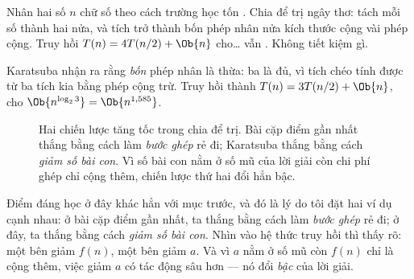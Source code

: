 \documentclass[../../algorithm.tex]{subfiles}
\begin{document}
Nhân hai số \(n\) chữ số theo cách trường học tốn . Chia để trị ngây thơ: tách mỗi số thành hai nửa, và tích trở thành bốn phép nhân nửa kích thước cộng vài phép cộng. Truy hồi \(T(n)=4T(n/2)+\Ob{n}\) cho\dots{} vẫn . Không tiết kiệm gì.

Karatsuba nhận ra rằng \emph{bốn} phép nhân là thừa: ba là đủ, vì tích chéo tính được từ ba tích kia bằng phép cộng trừ. Truy hồi thành \(T(n)=3T(n/2)+\Ob{n}\), cho \(\Ob{n^{\log_2 3}} = \Ob{n^{1,585}}\).

\begin{figure}[H]\centering
{}
\caption{Hai chiến lược tăng tốc trong chia để trị. Bài cặp điểm gần nhất thắng bằng cách làm \emph{bước ghép} rẻ đi; Karatsuba thắng bằng cách \emph{giảm số bài con}. Vì số bài con nằm ở số mũ của lời giải còn chi phí ghép chỉ cộng thêm, chiến lược thứ hai đổi hẳn bậc.}
\label{fig:karatsuba}
\end{figure}

Điểm đáng học ở đây khác hẳn với mục trước, và đó là lý do tôi đặt hai ví dụ cạnh nhau: ở bài cặp điểm gần nhất, ta thắng bằng cách làm \emph{bước ghép} rẻ đi; ở đây, ta thắng bằng cách \emph{giảm số bài con}. Nhìn vào hệ thức truy hồi thì thấy rõ: một bên giảm \(f(n)\), một bên giảm \(a\). Và vì \(a\) nằm ở số mũ còn \(f(n)\) chỉ là cộng thêm, việc giảm \(a\) có tác động sâu hơn --- nó đổi \emph{bậc} của lời giải.
\end{document}
